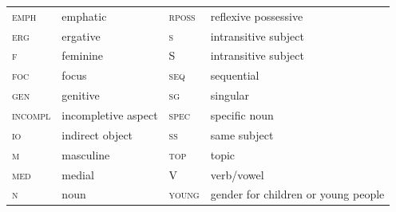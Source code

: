 \documentclass[output=collectionpaper]{langsci/langscibook}
\begin{document}
\begin{tabularx}{\textwidth}{lXlX}
  \textsc{emph}	&	emphatic	&	\textsc{rposs}	&	reflexive possessive	\\
  \textsc{erg}	&	ergative	&	\textsc{s}	&	intransitive subject	\\
  \textsc{f}	&	feminine	&	S 	&	intransitive subject	\\
  \textsc{foc}	&	focus	&	\textsc{seq}	&	sequential	\\
  \textsc{gen}	&	genitive	&	\textsc{sg}	&	singular	\\
  \textsc{incompl}	&	incompletive aspect	&	\textsc{spec}	&	specific noun	\\
  \textsc{io}	&	indirect object	&	\textsc{ss}	&	same subject	\\
  \textsc{m}	&	masculine	&	\textsc{top}	&	topic	\\
  \textsc{med}	&	medial	&	V 	&	verb/vowel	\\
  \textsc{n}	&	noun	&	\textsc{young}	&	gender for children or young people	\\
\end{tabularx}


\printbibliography[heading=subbibliography,notkeyword=this]

\newpage


\newpage


\label{lastpage:Waelchli}
\end{document}
